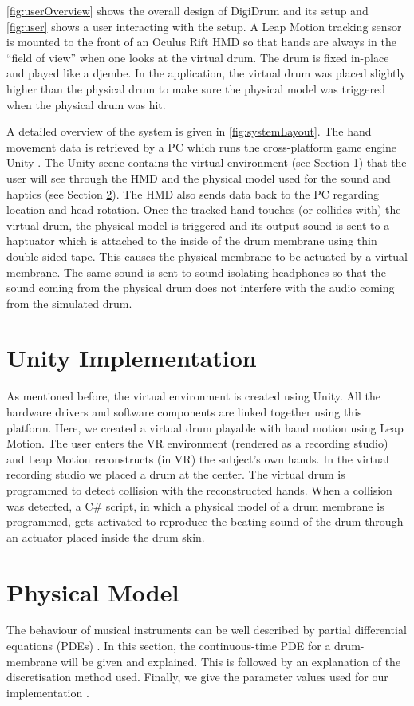 \documentclass{article}
\begin{document}
\autoref{fig:userOverview} shows the overall design of DigiDrum and its setup and \autoref{fig:user} shows a user interacting with the setup. A Leap Motion tracking sensor is mounted to the front of an Oculus Rift HMD so that hands are always in the ``field of view'' when one looks at the virtual drum. The drum is fixed in-place and played like a djembe. In the application, the virtual drum was placed slightly higher than the physical drum to make sure the physical model was triggered when the physical drum was hit.

A detailed overview of the system is given in \autoref{fig:systemLayout}. The hand movement data is retrieved by a PC which runs the cross-platform game engine Unity \cite{unity}. The Unity scene contains the virtual environment (see Section \ref{sec:unity}) that the user will see through the HMD and the physical model used for the sound and haptics (see Section \ref{sec:PM}). The HMD also sends data back to the PC regarding location and head rotation. Once the tracked hand touches (or collides with) the virtual drum, the physical model is triggered and its output sound is sent to a haptuator which is attached to the inside of the drum membrane using thin double-sided tape. This causes the physical membrane to be actuated by a virtual membrane. The same sound is sent to sound-isolating headphones so that the sound coming from the physical drum does not interfere with the audio coming from the simulated drum.

\section{Unity Implementation}\label{sec:unity}
As mentioned before, the virtual environment is  created using Unity. All the hardware drivers and software components are linked together using this platform. Here, we created a virtual drum playable with hand motion using Leap Motion. The user enters the VR environment (rendered as a recording studio) and Leap Motion reconstructs (in VR) the subject's own hands. In the virtual recording studio we placed a drum at the center. The virtual drum is programmed to detect collision with the reconstructed hands. When a collision was detected, a C\# script, in which a physical model of a drum membrane is programmed, gets activated to reproduce the beating sound of the drum through an actuator placed inside the drum skin.

\section{Physical Model}\label{sec:PM}
The behaviour of musical instruments can be well described by partial differential equations (PDEs) \cite{Fletcher1998}. In this section, the continuous-time PDE for a drum-membrane will be given and explained. This is followed by an explanation of the discretisation method used. Finally, we give the parameter values used for our implementation . 
\end{document}
